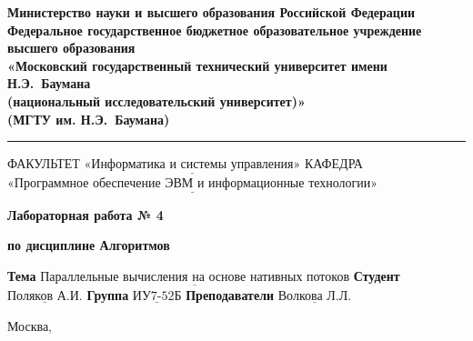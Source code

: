 \thispagestyle{empty}

\noindent\begin{minipage}{\textwidth}\centering
	\textbf{Министерство науки и высшего образования Российской Федерации}\\
	\textbf{Федеральное государственное бюджетное образовательное учреждение высшего образования}\\
	\textbf{«Московский государственный технический университет имени Н.Э.~Баумана}\\
	\textbf{(национальный исследовательский университет)»}\\
	\textbf{(МГТУ им. Н.Э.~Баумана)}
\end{minipage}

\noindent\rule{\linewidth}{3pt}
\newline\newline
\noindent ФАКУЛЬТЕТ $\underline{\text{«Информатика и системы управления»}}$ \newline\newline
\noindent КАФЕДРА $\underline{\text{«Программное обеспечение ЭВМ и информационные технологии»}}$

\vspace{1cm}

\begin{center}
	\noindent\centering
		\Large\textbf{Лабораторная работа № 4}
\end{center}

\begin{center}
	\noindent\centering
		\Large\textbf{по дисциплине  Алгоритмов\guillemotright}
\end{center}

\noindent\textbf{Тема} $\underline{\text{Параллельные вычисления на основе нативных потоков}}$\newline\newline
\noindent\textbf{Студент} $\underline{\text{Поляков А.И.}}$\newline\newline
\noindent\textbf{Группа} $\underline{\text{ИУ7-52Б}}$\newline\newline
\noindent\textbf{Преподаватели} $\underline{\text{Волкова Л.Л.}}$\newline

\begin{center}
	\vfill
	Москва,~\the\year
\end{center}
\clearpage